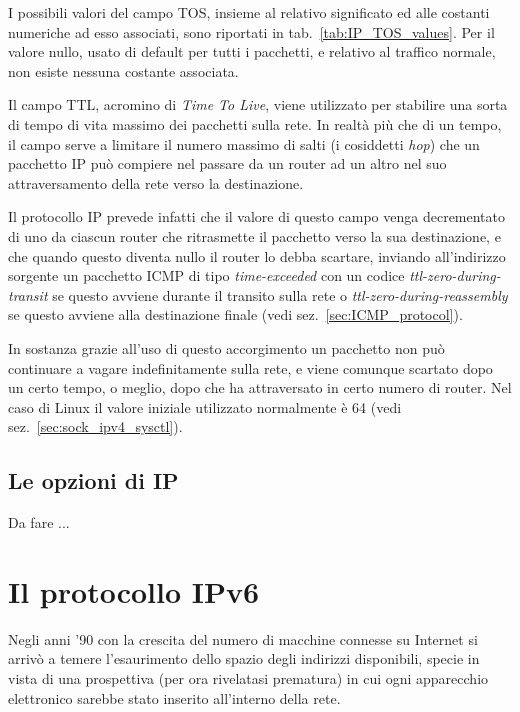 I possibili valori del campo TOS, insieme al relativo significato ed alle
costanti numeriche ad esso associati, sono riportati in
tab.~\ref{tab:IP_TOS_values}. Per il valore nullo, usato di default per tutti
i pacchetti, e relativo al traffico normale, non esiste nessuna costante
associata. 

Il campo TTL, acromino di \textit{Time To Live}, viene utilizzato per
stabilire una sorta di tempo di vita massimo dei pacchetti sulla rete. In
realtà più che di un tempo, il campo serve a limitare il numero massimo di
salti (i cosiddetti \textit{hop}) che un pacchetto IP può compiere nel passare
da un router ad un altro nel suo attraversamento della rete verso la
destinazione.

Il protocollo IP prevede infatti che il valore di questo campo venga
decrementato di uno da ciascun router che ritrasmette il pacchetto verso la
sua destinazione, e che quando questo diventa nullo il router lo debba
scartare, inviando all'indirizzo sorgente un pacchetto ICMP di tipo
\textit{time-exceeded} con un codice \textit{ttl-zero-during-transit} se
questo avviene durante il transito sulla rete o
\textit{ttl-zero-during-reassembly} se questo avviene alla destinazione finale
(vedi sez.~\ref{sec:ICMP_protocol}).

In sostanza grazie all'uso di questo accorgimento un pacchetto non può
continuare a vagare indefinitamente sulla rete, e viene comunque scartato dopo
un certo tempo, o meglio, dopo che ha attraversato in certo numero di
router. Nel caso di Linux il valore iniziale utilizzato normalmente è 64 (vedi
sez.~\ref{sec:sock_ipv4_sysctl}).



\subsection{Le opzioni di IP}
\label{sec:IP_options}

Da fare ...


\section{Il protocollo IPv6}
\label{sec:ipv6_protocol}

Negli anni '90 con la crescita del numero di macchine connesse su Internet si
arrivò a temere l'esaurimento dello spazio degli indirizzi disponibili, specie
in vista di una prospettiva (per ora rivelatasi prematura) in cui ogni
apparecchio elettronico sarebbe stato inserito all'interno della rete. 

